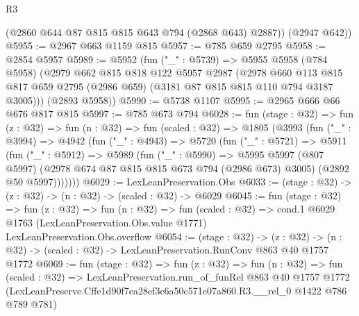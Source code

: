 \begin{lexlean}{R3}
\begin{coremodule}
        (@2860 @644 @87 @815 @815 @643 @794 (@2868 @643) @2887))
      (@2947 @642))
@5955 := @2967 @663 @1159 @815
@5957 := @785 @659 @2795
@5958 := @2854 @5957
@5989 := @5952
    (fun ("_" : @5739) =>
    @5955
      @5958
      (@784 @5958)
      (@2979
        @662
        @815
        @818
        @122
        @5957
        @2987
        (@2978
          @660
          @113
          @815
          @817
          @659
          @2795
          (@2986 @659)
          (@3181 @87 @815 @815 @110 @794 @3187 @3005)))
      (@2893 @5958))
@5990 := @5738 @1107
@5995 := @2965 @666 @66 @676 @817 @815
@5997 := @785 @673 @794
@6028 := fun (stage : @32) =>
  fun (z : @32) =>
  fun (n : @32) =>
  fun (scaled : @32) =>
  @1805
    (@3993
      (fun ("_" : @3994) =>
      @4942
        (fun ("_" : @4943) =>
        @5720
          (fun ("_" : @5721) =>
          @5911
            (fun ("_" : @5912) =>
            @5989
              (fun ("_" : @5990) =>
              @5995
                @5997
                (@807 @5997)
                (@2978 @674 @87 @815 @815 @673 @794 (@2986 @673) @3005)
                (@2892 @50 @5997)))))))
@6029 := LexLeanPreservation.Obs
@6033 := (stage : @32) -> (z : @32) -> (n : @32) -> (scaled : @32) -> @6029
@6045 := fun (stage : @32) =>
  fun (z : @32) =>
  fun (n : @32) =>
  fun (scaled : @32) =>
  cond.{1} @6029 @1763 (LexLeanPreservation.Obs.value @1771) LexLeanPreservation.Obs.overflow
@6054 := (stage : @32) ->
  (z : @32) -> (n : @32) -> (scaled : @32) -> LexLeanPreservation.RunConv @863 @40 @1757 @1772
@6069 := fun (stage : @32) =>
  fun (z : @32) =>
  fun (n : @32) =>
  fun (scaled : @32) =>
  LexLeanPreservation.run_of_funRel
    @863
    @40
    @1757
    @1772
    (LexLeanPreserve.Cffe1d90f7ea28ef3c6a50c571e07a860.R3.__rel_0 @1422 @786 @789 @781)
\end{coremodule}
\end{lexlean}
